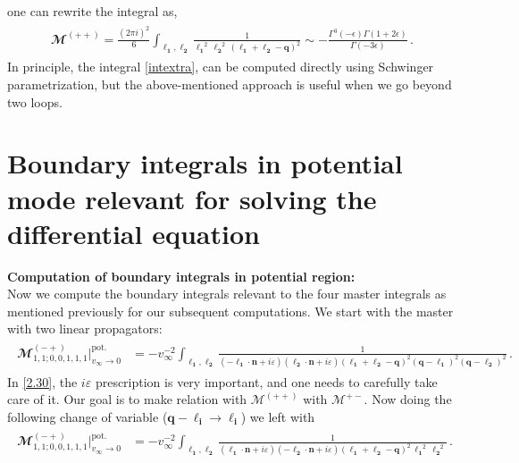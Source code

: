 one can rewrite the integral as,
\begin{align}
    \begin{split}
        \mathbfcal{M}^{(++)}=\frac{(2\pi i)^2}{6}\int_{\boldsymbol{\ell_1},\boldsymbol{\ell_2}}\frac{1}{\boldsymbol{\ell_1}^2\,\boldsymbol{\ell_2}^2\,(\boldsymbol{\ell_1}+\boldsymbol{\ell_2}-\boldsymbol{q})^2}\sim -\frac{\Gamma^3(-\epsilon)\Gamma(1+2\epsilon)}{\Gamma(-3\epsilon)}\,.
    \end{split}
\end{align}
In principle, the integral \eqref{intextra}, can be computed directly using Schwinger parametrization, but the above-mentioned approach is useful when we go beyond two loops.
\section{Boundary integrals in potential mode relevant for solving the differential equation}\label{ch3:app:B}
\textbf{Computation of boundary integrals in potential region:}\\ Now we compute the boundary integrals relevant to the four master integrals as mentioned previously for our subsequent computations.
We start with the master with two linear propagators:
$\,\,$\begin{align}
    \begin{split}
        \mathbfcal{M}_{1,1;0,0,1,1,1}^{(-+)}\Big|_{v_{\infty}\to 0}^{\textrm{pot.}}&=-v_{\infty}^{-2}\int_{\boldsymbol{\ell_1},\boldsymbol{\ell_2}}\frac{1}{(-\boldsymbol{\ell_1}\cdot \boldsymbol{n}+i\varepsilon)(\boldsymbol{\ell_2}\cdot \boldsymbol{n}+i\varepsilon)(\boldsymbol{\ell_1}+\boldsymbol{\ell_2}-\boldsymbol{q})^2(\boldsymbol{q}-\boldsymbol{\ell_1})^2(\boldsymbol{q}-\boldsymbol{\ell_2})^2}\,.\label{2.30}
    \end{split}
\end{align}
In \eqref{2.30}, the $i\varepsilon$  prescription is very important, and one needs to carefully take care of it. Our goal is to make relation with $\mathcal{M}^{(++)}$ with $\mathcal{M}^{+-}$. Now doing the following change of variable ($\boldsymbol{q}-\boldsymbol{\ell_i}\to \boldsymbol{\ell_i}$) we left with 
\begin{align}
    \begin{split}
        \mathbfcal{M}_{1,1;0,0,1,1,1}^{(-+)}\Big|_{v_{\infty}\to 0}^{\textrm{pot.}}&=-v_{\infty}^{-2}\int_{\boldsymbol{\ell_1},\boldsymbol{\ell_2}}\frac{1}{(\boldsymbol{\ell_1}\cdot \boldsymbol{n}+i\varepsilon)(-\boldsymbol{\ell_2}\cdot \boldsymbol{n}+i\varepsilon)(\boldsymbol{\ell_1}+\boldsymbol{\ell_2}-\boldsymbol{q})^2\,\boldsymbol{\ell_1}^2\,\boldsymbol{\ell_2}^2}\,.
    \end{split}
\end{align}
